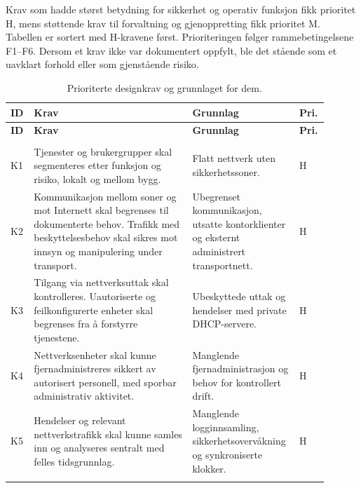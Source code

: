 Krav som hadde størst betydning for sikkerhet og operativ funksjon fikk prioritet H, mens støttende krav til forvaltning og gjenoppretting fikk prioritet M. Tabellen er sortert med H-kravene først. Prioriteringen følger rammebetingelsene F1--F6. Dersom et krav ikke var dokumentert oppfylt, ble det stående som et uavklart forhold eller som gjenstående risiko.

\begingroup
\small
\setlength{\tabcolsep}{4pt}
\renewcommand{\arraystretch}{1.18}
\captionsetup{justification=centering,singlelinecheck=false}
\begin{longtable}{@{}>{\raggedright\arraybackslash}p{0.055\linewidth} >{\raggedright\arraybackslash}p{0.48\linewidth} >{\raggedright\arraybackslash}p{0.30\linewidth} >{\centering\arraybackslash}p{0.065\linewidth}@{}}
\caption{Prioriterte designkrav og grunnlaget for dem.}\label{tab:designkrav}\\
\toprule
\textbf{ID} & \textbf{Krav} & \textbf{Grunnlag} & \textbf{Pri.} \\
\midrule
\endfirsthead
\toprule
\textbf{ID} & \textbf{Krav} & \textbf{Grunnlag} & \textbf{Pri.} \\
\midrule
\endhead
\midrule
\multicolumn{4}{r}{Fortsetter på neste side}\\
\endfoot
\bottomrule
\endlastfoot
K1 & Tjenester og brukergrupper skal segmenteres etter funksjon og risiko, lokalt og mellom bygg. & Flatt nettverk uten sikkerhetssoner. & H \\
\addlinespace
K2 & Kommunikasjon mellom soner og mot Internett skal begrenses til dokumenterte behov. Trafikk med beskyttelsesbehov skal sikres mot innsyn og manipulering under transport. & Ubegrenset kommunikasjon, utsatte kontorklienter og eksternt administrert transportnett. & H \\
\addlinespace
K3 & Tilgang via nettverksuttak skal kontrolleres. Uautoriserte og feilkonfigurerte enheter skal begrenses fra å forstyrre tjenestene. & Ubeskyttede uttak og hendelser med private DHCP-servere. & H \\
\addlinespace
K4 & Nettverksenheter skal kunne fjernadministreres sikkert av autorisert personell, med sporbar administrativ aktivitet. & Manglende fjernadministrasjon og behov for kontrollert drift. & H \\
\addlinespace
K5 & Hendelser og relevant nettverkstrafikk skal kunne samles inn og analyseres sentralt med felles tidsgrunnlag. & Manglende logginnsamling, sikkerhetsovervåkning og synkroniserte klokker. & H \\
\addlinespace

\end{longtable}
